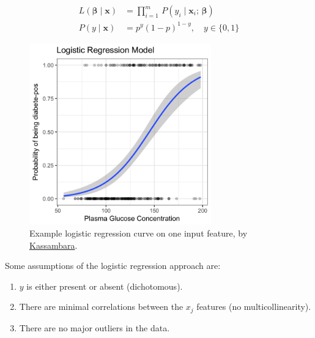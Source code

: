 \begin{subequations} \label{eq:logistic:L_Pr}
\begin{align}
L\left(\bm{\beta} \mid \mathbf{x}\right) &= \prod_{i=1}^{m} \, P\left(y_{i} \mid \mathbf{x}_{i};\,\bm{\beta}\right) \label{eq:logistic:L} \\
P\left(y \mid \mathbf{x}\right) &= p^y\left(1-p\right)^{1-y}, \quad y \in \{0, 1\} \label{eq:logistic:Pr}
\end{align}
\end{subequations}

\begin{figure}
\centering
\includegraphics[width=0.7\textwidth]{figures/regression/logistic-regression-probabilities-curve.png}
\caption{
Example logistic regression curve on one input feature, by \href{http://www.sthda.com/english/articles/36-classification-methods-essentials/151-logistic-regression-essentials-in-r/}{Kassambara}.
}
\label{fig:logistic_regression_ex}
\end{figure}

Some assumptions of the logistic regression approach are:
\begin{enumerate}[noitemsep]
  \item $y$ is either present or absent (dichotomous).
  \item There are minimal correlations between the $x_{j}$ features (no multicollinearity).
  \item There are no major outliers in the data.
\end{enumerate}


